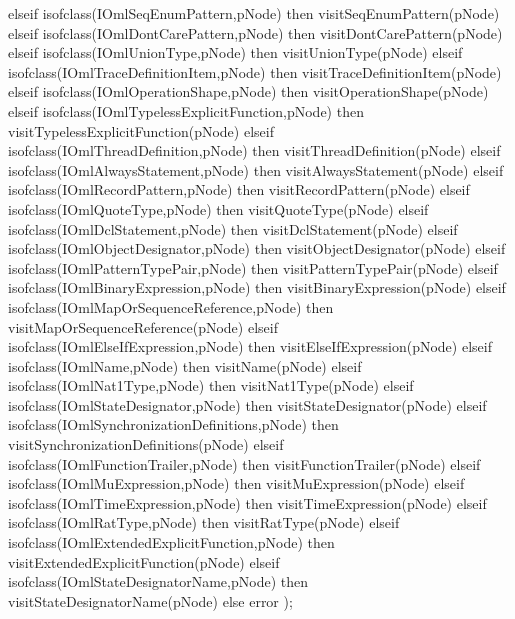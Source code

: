\begin{vdm_al}
      elseif isofclass(IOmlSeqEnumPattern,pNode) then visitSeqEnumPattern(pNode)
      elseif isofclass(IOmlDontCarePattern,pNode) then visitDontCarePattern(pNode)
      elseif isofclass(IOmlUnionType,pNode) then visitUnionType(pNode)
      elseif isofclass(IOmlTraceDefinitionItem,pNode) then visitTraceDefinitionItem(pNode)
      elseif isofclass(IOmlOperationShape,pNode) then visitOperationShape(pNode)
      elseif isofclass(IOmlTypelessExplicitFunction,pNode) then visitTypelessExplicitFunction(pNode)
      elseif isofclass(IOmlThreadDefinition,pNode) then visitThreadDefinition(pNode)
      elseif isofclass(IOmlAlwaysStatement,pNode) then visitAlwaysStatement(pNode)
      elseif isofclass(IOmlRecordPattern,pNode) then visitRecordPattern(pNode)
      elseif isofclass(IOmlQuoteType,pNode) then visitQuoteType(pNode)
      elseif isofclass(IOmlDclStatement,pNode) then visitDclStatement(pNode)
      elseif isofclass(IOmlObjectDesignator,pNode) then visitObjectDesignator(pNode)
      elseif isofclass(IOmlPatternTypePair,pNode) then visitPatternTypePair(pNode)
      elseif isofclass(IOmlBinaryExpression,pNode) then visitBinaryExpression(pNode)
      elseif isofclass(IOmlMapOrSequenceReference,pNode) then visitMapOrSequenceReference(pNode)
      elseif isofclass(IOmlElseIfExpression,pNode) then visitElseIfExpression(pNode)
      elseif isofclass(IOmlName,pNode) then visitName(pNode)
      elseif isofclass(IOmlNat1Type,pNode) then visitNat1Type(pNode)
      elseif isofclass(IOmlStateDesignator,pNode) then visitStateDesignator(pNode)
      elseif isofclass(IOmlSynchronizationDefinitions,pNode) then visitSynchronizationDefinitions(pNode)
      elseif isofclass(IOmlFunctionTrailer,pNode) then visitFunctionTrailer(pNode)
      elseif isofclass(IOmlMuExpression,pNode) then visitMuExpression(pNode)
      elseif isofclass(IOmlTimeExpression,pNode) then visitTimeExpression(pNode)
      elseif isofclass(IOmlRatType,pNode) then visitRatType(pNode)
      elseif isofclass(IOmlExtendedExplicitFunction,pNode) then visitExtendedExplicitFunction(pNode)
      elseif isofclass(IOmlStateDesignatorName,pNode) then visitStateDesignatorName(pNode)
      else error );


\end{vdm_al}
